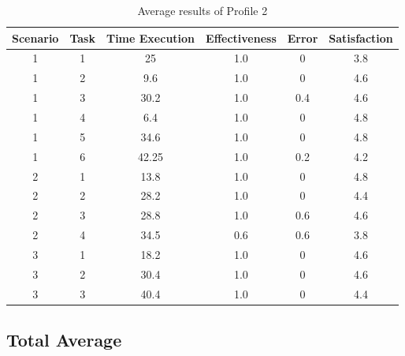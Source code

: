 \begin{table}[H]
  \begin{center}
    \begin{tabular}{||c|c|c|c|c|c||} %
      \textbf{Scenario} & \textbf{Task} & \textbf{Time Execution} & \textbf{Effectiveness} & \textbf{Error} & \textbf{Satisfaction}\\
      
      \hline
        1 & 1 & 25 & 1.0 & 0 & 3.8\\
        1 & 2 & 9.6 & 1.0 & 0 & 4.6\\
        1 & 3 & 30.2 & 1.0 & 0.4 & 4.6\\
        1 & 4 & 6.4 & 1.0 & 0 & 4.8\\
        1 & 5 & 34.6 & 1.0 & 0 & 4.8\\
        1 & 6 & 42.25 & 1.0 & 0.2 & 4.2\\
        \hline
        2 & 1 & 13.8 & 1.0 & 0 & 4.8\\
        2 & 2 & 28.2 & 1.0 & 0 & 4.4\\
        2 & 3 & 28.8 & 1.0 & 0.6 & 4.6\\
        2 & 4 & 34.5 & 0.6 & 0.6 & 3.8\\
        \hline
        3 & 1 & 18.2 & 1.0 & 0 & 4.6\\
        3 & 2 & 30.4 & 1.0 & 0 & 4.6\\
        3 & 3 & 40.4 & 1.0 & 0 & 4.4\\
        \hline

    \end{tabular}
  \end{center}
  \caption{Average results of Profile 2}
\end{table}

\subsection{Total Average}

